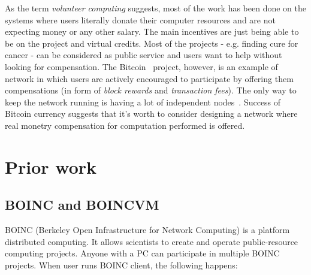 \begin{comment}
bitcoiny tutaj
Nakamoto2008_bitcoin.pdf

jak bardzo ogolnikowo pisac?
- nagrody (coraz mniejsze)
- 51\%

\end{comment}

As the term \emph{volunteer computing} suggests, most of the work has been done on the systems where users literally donate their computer resources and are not expecting money or any other salary. The main incentives are just being able to be on the project and virtual credits. Most of the projects - e.g. finding cure for cancer - can be considered as public service and users want to help without looking for compensation. The Bitcoin~\cite{nakamoto2008bitcoin} project, however, is an example of network in which users are actively encouraged to participate by offering them compensations (in form of \emph{block rewards} and \emph{transaction fees}). The only way to keep the network running is having a lot of independent nodes~\cite{barber2012bitter}. Success of Bitcoin currency suggests that it's worth to consider designing a network where real monetry compensation for computation performed is offered.

\begin{comment}

podsumowanie volunteer:
- uczestnicza nieodplatnie, kiedy podoba im sie projekt albo za wirtualne credits
- wykorzystywany przez uczelnie bez sprzetu i pieniedzy

\end{comment}

\section{Prior work}

\subsection{BOINC and BOINCVM}

\begin{comment}
dodać boincowe obrazki, screenshoty
\end{comment}

BOINC (Berkeley Open Infrastructure for Network Computing) is a platform distributed computing. It allows scientists to create and operate public-resource computing projects. Anyone with a PC can participate in multiple BOINC projects. When user runs BOINC client, the following happens:

